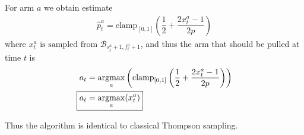 For arm $a$ we obtain estimate
\begin{align*}
    \hat{p}_t^a = \text{clamp}_{[0,1]}\left(\dfrac{1}{2} + \dfrac{2x_t^a - 1}{2p}\right)
\end{align*}
where $\boxed{x_t^a\text{ is sampled from }\mathcal{B}_{s_t^a+1,f_t^a+1}}$, and thus the arm that should be pulled at time $t$ is
\begin{align*}
    a_t &= \argmax_a\left(\text{clamp}_{[0,1]}\left(\dfrac{1}{2} + \dfrac{2x_t^a - 1}{2p}\right)\right) \\
    \Aboxed{a_t &= \argmax_a (x_t^a)}
\end{align*}

Thus the algorithm is identical to classical Thompson sampling.
